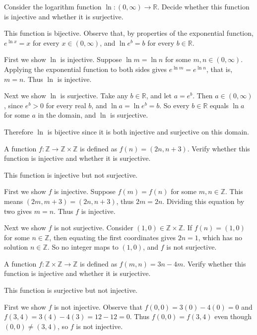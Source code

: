 \documentclass[DIN, pagenumber=false, fontsize=11pt, parskip=half]{scrartcl}
\begin{document}
\begin{problems}
    \problem Consider the logarithm function $\ln : (0,\infty) \to \mathbb{R}$. Decide whether this function is injective and whether it is surjective.

    \answer This function is bijective. Observe that, by properties of the exponential function, $e^{\ln{x}} = x$ for every $x \in (0,\infty)$, and $\ln{e^{b}} = b$ for every $b \in \mathbb{R}$.

    First we show $\ln$ is injective. Suppose $\ln{m} = \ln{n}$ for some $m,n \in (0,\infty)$. Applying the exponential function to both sides gives $e^{\ln{m}} = e^{\ln{n}}$, that is, $m = n$. Thus $\ln$ is injective.

    Next we show $\ln$ is surjective. Take any $b \in \mathbb{R}$, and let $a = e^{b}$. Then $a \in (0,\infty)$, since $e^{b} > 0$ for every real $b$, and $\ln{a} = \ln{e^{b}} = b$.
    So every $b \in \mathbb{R}$ equals $\ln{a}$ for some $a$ in the domain, and $\ln$ is surjective.

    Therefore $\ln$ is  bijective since it is both injective and surjective on this domain.

    \problem A function $f : \mathbb{Z} \to \mathbb{Z} \times \mathbb{Z}$ is defined as $f(n) = (2n, n+3)$. Verify whether this function is injective and whether it is surjective.

    \answer This function is injective but not surjective.

    First we show $f$ is injective. Suppose $f(m) = f(n)$ for some $m,n \in \mathbb{Z}$. This means $(2m, m+3) = (2n, n+3)$, thus $2m = 2n$. Dividing this equation by two gives $m = n$. Thus $f$ is injective.

    Next we show $f$ is not surjective. Consider $(1,0) \in \mathbb{Z} \times \mathbb{Z}$. If $f(n) = (1,0)$ for some $n \in \mathbb{Z}$, then equating the first coordinates gives $2n = 1$, which has no solution $n \in \mathbb{Z}$. So no integer maps to $(1,0)$, and $f$ is not surjective.

    \problem A function $f : \mathbb{Z} \times \mathbb{Z} \to \mathbb{Z}$ is defined as $f(m,n) = 3n - 4m$. Verify whether this function is injective and whether it is surjective.

    \answer This function is surjective but not injective.

    First we show $f$ is not injective. Observe that $f(0,0) = 3(0) - 4(0) = 0$ and $f(3,4) = 3(4) - 4(3) = 12 - 12 = 0$. Thus $f(0,0) = f(3,4)$ even though $(0,0) \neq (3,4)$, so $f$ is not injective.


\end{problems}
\end{document}
